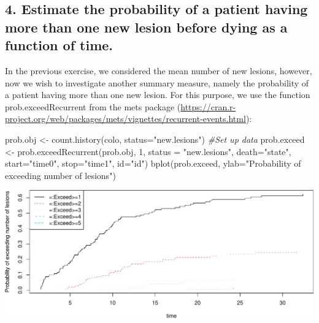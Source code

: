\documentclass[
  11pt,
]{article}
\newenvironment{Shaded}{\begin{snugshade}}{\end{snugshade}}
\newcommand{\AttributeTok}[1]{\textcolor[rgb]{0.77,0.63,0.00}{#1}}
\newcommand{\CommentTok}[1]{\textcolor[rgb]{0.56,0.35,0.01}{\textit{#1}}}
\newcommand{\DecValTok}[1]{\textcolor[rgb]{0.00,0.00,0.81}{#1}}
\newcommand{\FunctionTok}[1]{\textcolor[rgb]{0.00,0.00,0.00}{#1}}
\newcommand{\NormalTok}[1]{#1}
\newcommand{\OtherTok}[1]{\textcolor[rgb]{0.56,0.35,0.01}{#1}}
\newcommand{\StringTok}[1]{\textcolor[rgb]{0.31,0.60,0.02}{#1}}
\begin{document}
\hypertarget{estimate-the-probability-of-a-patient-having-more-than-one-new-lesion-before-dying-as-a-function-of-time.}{%
\subsection{4. Estimate the probability of a patient having more than
one new lesion before dying as a function of
time.}\label{estimate-the-probability-of-a-patient-having-more-than-one-new-lesion-before-dying-as-a-function-of-time.}}

In the previous exercise, we considered the mean number of new lesions,
however, now we wish to investigate another summary measure, namely the
probability of a patient having more than one new lesion. For this
purpose, we use the function prob.exceedRecurrent from the mets package
(\url{https://cran.r-project.org/web/packages/mets/vignettes/recurrent-events.html}):

\begin{Shaded}
\begin{Highlighting}[]
\NormalTok{prob.obj }\OtherTok{\textless{}{-}} \FunctionTok{count.history}\NormalTok{(colo, }\AttributeTok{status=}\StringTok{"new.lesions"}\NormalTok{) }\CommentTok{\#Set up data}
\NormalTok{prob.exceed }\OtherTok{\textless{}{-}} \FunctionTok{prob.exceedRecurrent}\NormalTok{(prob.obj, }\DecValTok{1}\NormalTok{, }\AttributeTok{status =} \StringTok{"new.lesions"}\NormalTok{, }
                                    \AttributeTok{death=}\StringTok{"state"}\NormalTok{, }\AttributeTok{start=}\StringTok{"time0"}\NormalTok{, }\AttributeTok{stop=}\StringTok{"time1"}\NormalTok{, }\AttributeTok{id=}\StringTok{"id"}\NormalTok{)}
\FunctionTok{bplot}\NormalTok{(prob.exceed, }\AttributeTok{ylab=}\StringTok{"Probability of exceeding number of lesions"}\NormalTok{)}
\end{Highlighting}
\end{Shaded}

\includegraphics{Exam2021_PracticalPart_files/figure-latex/unnamed-chunk-16-1.pdf}
\end{document}
